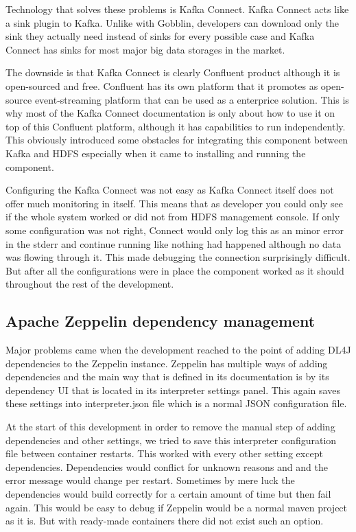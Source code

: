 Technology that solves these problems is Kafka Connect. 
Kafka Connect acts like a sink plugin to Kafka.
Unlike with Gobblin, developers can download only the sink they actually need instead of sinks for every possible case and Kafka Connect has sinks for most major big data storages in the market.

The downside is that Kafka Connect is clearly Confluent product although it is open-sourced and free.
Confluent has its own platform that it promotes as open-source event-streaming platform that can be used as a enterprice solution. 
This is why most of the Kafka Connect documentation is only about how to use it on top of this Confluent platform, although it has capabilities to run independently.
This obviously introduced some obstacles for integrating this component between Kafka and HDFS especially when it came to installing and running the component.

Configuring the Kafka Connect was not easy as Kafka Connect itself does not offer much monitoring in itself.
This means that as developer you could only see if the whole system worked or did not from HDFS management console.
If only some configuration was not right, Connect would only log this as an minor error in the stderr and continue running like nothing had happened although no data was flowing through it.
This made debugging the connection surprisingly difficult. 
But after all the configurations were in place the component worked as it should throughout the rest of the development.

\subsection{Apache Zeppelin dependency management}

Major problems came when the development reached to the point of adding DL4J dependencies to the Zeppelin instance.
Zeppelin has multiple ways of adding dependencies and the main way that is defined in its documentation is by its dependency UI that is located in its interpreter settings panel.
This again saves these settings into interpreter.json file which is a normal JSON configuration file.

At the start of this development in order to remove the manual step of adding dependencies and other settings, we tried to save this interpreter configuration file between container restarts.
This worked with every other setting except dependencies.
Dependencies would conflict for unknown reasons and and the error message would change per restart.
Sometimes by mere luck the dependencies would build correctly for a certain amount of time but then fail again.
This would be easy to debug if Zeppelin would be a normal maven project as it is.
But with ready-made containers there did not exist such an option.

